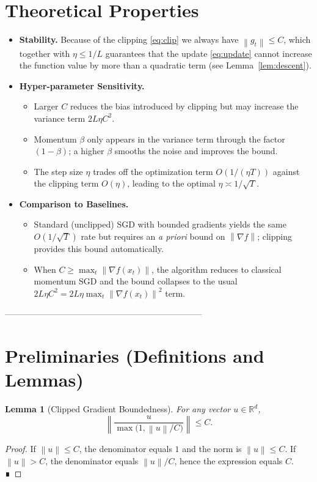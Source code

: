 \documentclass{article}
\newtheorem{lemma}{Lemma}
\newcommand{\R}{\mathbb{R}}
\newcommand{\norm}[1]{\left\lVert#1\right\rVert}
\begin{document}
\section*{Theoretical Properties}
\begin{itemize}
\item \textbf{Stability.} Because of the clipping \eqref{eq:clip} we always have $\norm{g_{t}}\le C$, which together with $\eta\le 1/L$ guarantees that the update \eqref{eq:update} cannot increase the function value by more than a quadratic term (see Lemma~\ref{lem:descent}).
\item \textbf{Hyper‑parameter Sensitivity.}
    \begin{itemize}
        \item Larger $C$ reduces the bias introduced by clipping but may increase the variance term $2L\eta C^{2}$.
        \item Momentum $\beta$ only appears in the variance term through the factor $(1-\beta)$; a higher $\beta$ smooths the noise and improves the bound.
        \item The step size $\eta$ trades off the optimization term $O(1/(\eta T))$ against the clipping term $O(\eta)$, leading to the optimal $\eta\asymp 1/\sqrt{T}$.
    \end{itemize}
\item \textbf{Comparison to Baselines.}
    \begin{itemize}
        \item Standard (unclipped) SGD with bounded gradients yields the same $O(1/\sqrt{T})$ rate but requires an \emph{a priori} bound on $\norm{\nabla f}$; clipping provides this bound automatically.
        \item When $C\ge \max_{t}\norm{\nabla f(x_{t})}$, the algorithm reduces to classical momentum SGD and the bound collapses to the usual $2L\eta C^{2}=2L\eta\max_{t}\norm{\nabla f(x_{t})}^{2}$ term.
    \end{itemize}
\end{itemize}

---------------------------------------------------------------------

\section*{Preliminaries (Definitions and Lemmas)}
\begin{lemma}[Clipped Gradient Boundedness]\label{lem:clipbound}
For any vector $u\in\R^{d}$,
\[
\norm{\frac{u}{\max\!\bigl(1,\norm{u}/C\bigr)}}\le C .
\]
\end{lemma}
\begin{proof}
If $\norm{u}\le C$, the denominator equals $1$ and the norm is $\norm{u}\le C$.  
If $\norm{u}>C$, the denominator equals $\norm{u}/C$, hence the expression equals $C$. ∎
\end{proof}
\end{document}
